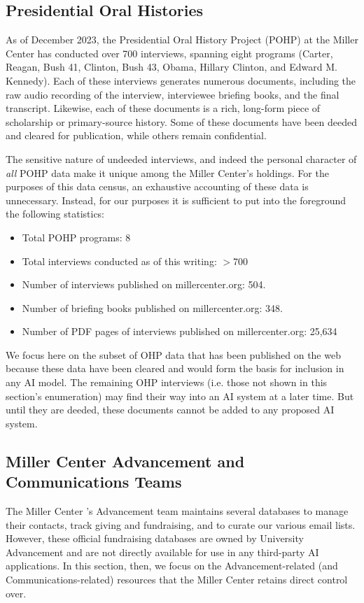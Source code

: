 \documentclass[12pt, oneside]{article}   	%
\begin{document}
\subsection{Presidential Oral Histories}\label{section.data.pohp}
As of December 2023, the Presidential Oral History Project (POHP) at the Miller Center has conducted over 700 interviews, spanning eight programs (Carter, Reagan, Bush 41, Clinton, Bush 43, Obama, Hillary Clinton, and Edward M. Kennedy).  Each of these interviews generates numerous documents, including the raw audio recording of the interview, interviewee briefing books, and the final transcript.  Likewise, each of these documents is a rich, long-form piece of scholarship or primary-source history.  Some of these documents have been deeded and cleared for publication, while others remain confidential.  

The sensitive nature of undeeded interviews, and indeed the personal character of \emph{all} POHP data make it unique among the Miller Center’s holdings.  For the purposes of this data census, an exhaustive accounting of these data is unnecessary.  Instead, for our purposes it is sufficient to put into the foreground the following statistics:
\begin{itemize}
\item Total POHP programs:  8
\item Total interviews conducted as of this writing: $>$700
\item Number  of interviews published on millercenter.org:  504.
\item Number  of briefing books published on millercenter.org: 348.
\item Number of PDF pages of interviews published on millercenter.org: 25,634
\end{itemize}
We focus here on the subset of OHP data that has been published on the web because these data have been cleared and would form the basis for inclusion in any AI model.  The remaining OHP interviews (i.e. those not shown in this section's enumeration) may find their way into an AI system at a later time.  But until they are deeded, these documents cannot be added to any proposed AI system.

 


\subsection{Miller Center Advancement and Communications Teams}\label{section.data.advancement}
The Miller Center 's Advancement team maintains several databases to manage their contacts, track giving and fundraising, and to curate our various email lists.  However, these official fundraising databases are owned by University Advancement and are not directly available for use in any third-party AI applications.  In this section, then, we focus on the Advancement-related (and Communications-related) resources that the Miller Center retains direct control over.
\end{document}
